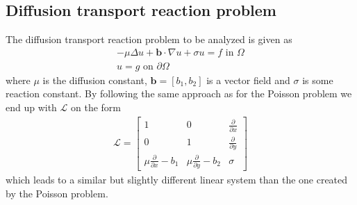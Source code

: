 \subsection{Diffusion transport reaction problem}
%
The diffusion transport reaction problem to be analyzed is given as 
\begin{align}
	-\mu \Delta u + \mathbf{b} \cdot \nabla u +\sigma u = f \text{ in } \Omega \\
	u = g \text{ on } \partial \Omega
	\label{eq:DiffTrans}
\end{align}
where $ \mu$ is the diffusion constant, $\mathbf{b} = [b_1 , b_2]$ is a vector field and $\sigma$ is some reaction constant. By following the same approach as for the Poisson problem we end up with $\mathcal{L}$ on the form
\begin{align}
	\mathcal{L} =
	\begin{bmatrix}
		1 & 0 & \frac{\partial} {\partial x}  \\
		0 & 1 & \frac{\partial} {\partial y}  \\
		\mu \frac{\partial} {\partial x} - b_1 & \mu \frac{\partial} {\partial y} -b_2 & \sigma
	\end{bmatrix}
	\label{eq:AmatrixDiff}
\end{align}
which leads to a similar but slightly different linear system than the one created by the Poisson problem.


